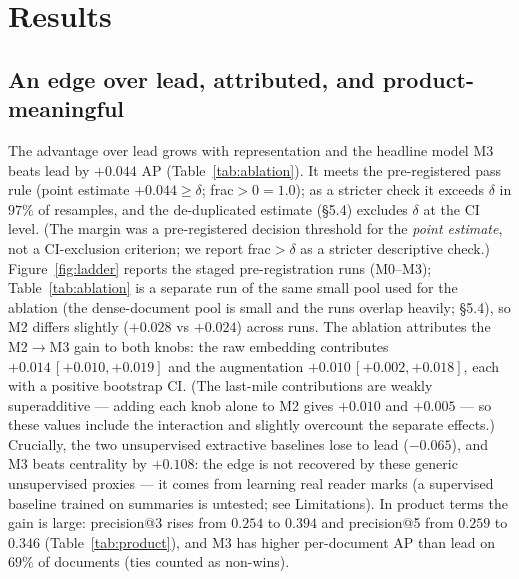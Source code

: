 \documentclass[11pt]{article}
\begin{document}
\section{Results}

\subsection{An edge over lead, attributed, and product-meaningful}
The advantage over lead grows with representation and the headline model M3 beats lead by
$+0.044$ AP (Table~\ref{tab:ablation}). It meets the pre-registered pass rule (point estimate
$+0.044 \geq \delta$; frac${>}0=1.0$); as a stricter check it exceeds $\delta$ in $97\%$ of
resamples, and the de-duplicated estimate (\S5.4) excludes $\delta$ at the CI level. (The margin
was a pre-registered decision threshold for the \emph{point estimate}, not a CI-exclusion
criterion; we report frac${>}\delta$ as a stricter descriptive check.)
Figure~\ref{fig:ladder} reports the staged pre-registration runs (M0--M3); Table~\ref{tab:ablation}
is a separate run of the same small pool used for the ablation (the dense-document pool is small
and the runs overlap heavily; \S5.4), so M2 differs slightly ($+0.028$ vs $+0.024$) across runs.
The ablation attributes the M2$\to$M3 gain to both knobs: the raw embedding contributes
$+0.014\,[+0.010,+0.019]$ and the augmentation $+0.010\,[+0.002,+0.018]$, each with a positive
bootstrap CI. (The last-mile contributions are weakly superadditive --- adding each knob alone to
M2 gives $+0.010$ and $+0.005$ --- so these values include the interaction and slightly overcount
the separate effects.) Crucially, the two unsupervised extractive baselines lose to lead
($-0.065$), and M3 beats centrality by $+0.108$: the edge is not recovered by these generic
unsupervised proxies --- it comes from learning real reader marks (a supervised baseline trained
on summaries is untested; see Limitations). In product terms the gain is large: precision@3
rises from $0.254$ to $0.394$ and precision@5 from $0.259$ to $0.346$ (Table~\ref{tab:product}),
and M3 has higher per-document AP than lead on $69\%$ of documents (ties counted as non-wins).
\end{document}
